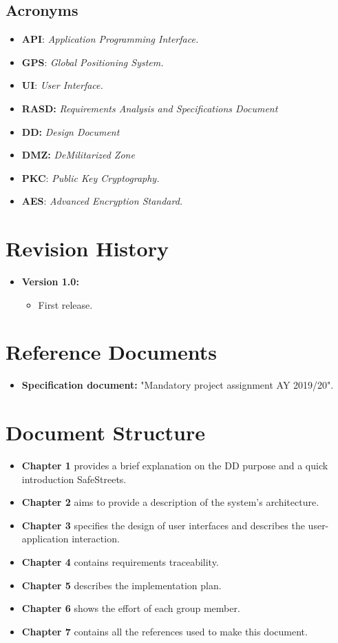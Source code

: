 \documentclass[12pt,a4paper]{report}
\begin{document}
			\subsection{Acronyms}
				\begin{itemize}
				\item \textbf{API}: \emph{Application Programming Interface.}
				\item \textbf{GPS}: \emph{Global Positioning System.}
				\item \textbf{UI}: \emph{User Interface.}
				\item \textbf{RASD:} \emph{Requirements Analysis and Specifications Document}
				\item \textbf{DD:} \emph{Design Document}
				\item \textbf{DMZ:} \emph{DeMilitarized Zone}			
				\item \textbf{PKC}: \emph{Public Key Cryptography.}		
				\item \textbf{AES}: \emph{Advanced Encryption Standard.}		
				\end{itemize}
		\section{Revision History}
			\begin{itemize}
				\item \textbf{Version 1.0:} 
				\begin{itemize}
					\item First release.
				\end{itemize}
			\end {itemize}
		\section{Reference Documents}
			\begin{itemize}
				\item \textbf{Specification document:} "Mandatory project assignment AY 2019/20".
			\end{itemize}
		\section{Document Structure}
			\begin{itemize}
				\item \textbf{Chapter 1} provides a brief explanation on the DD purpose and a quick introduction
					SafeStreets.
				\item \textbf{Chapter 2} aims to provide a description of the system's architecture. 
				\item \textbf{Chapter 3} specifies the design of user interfaces and describes the user-application
					interaction.
				\item \textbf{Chapter 4} contains requirements traceability.
				\item \textbf{Chapter 5} describes the implementation plan.
				\item \textbf{Chapter 6} shows the effort of each group member.
				\item \textbf{Chapter 7} contains all the references used to make this document. 
			\end{itemize}
	
\end{document}
